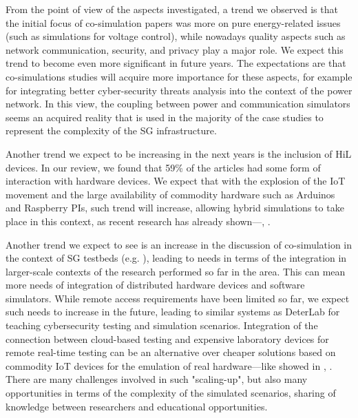 \documentclass[1p]{elsarticle} %
\begin{document}
From the point of view of the aspects investigated, a trend we observed is that the initial focus of co-simulation papers was more on pure energy-related issues (such as simulations for voltage control), while nowadays quality aspects such as network communication, security, and privacy play a major role. We expect this trend to become even more significant in future years. The expectations are that co-simulations studies will acquire more importance for these aspects, for example for integrating better cyber-security threats analysis into the context of the power network. In this view, the coupling between power and communication simulators seems an acquired reality that is used in the majority of the case studies to represent the complexity of the SG infrastructure.

Another trend we expect to be increasing in the next years is the inclusion of HiL devices. In our review, we found that 59\% of the articles had some form of interaction with hardware devices. We expect that with the explosion of the IoT movement and the large availability of commodity hardware such as Arduinos and Raspberry PIs, such trend will increase, allowing hybrid simulations to take place in this context, as recent research has already shown---\cite{094-Schvarcbacher2017-SmartGridsCo,ref:schvar2018SGTMP}, .

Another trend we expect to see is an increase in the discussion of co-simulation in the context of SG testbeds (e.g. \cite{ref:cintuglu2017survey}), leading to needs in terms of the integration in larger-scale contexts of the research performed so far in the area. This can mean more needs of integration of distributed hardware devices and software simulators. While remote access requirements have been limited so far, we expect such needs to increase in the future, leading to similar systems as DeterLab \citep{ref:mirkovic2012teaching} for teaching cybersecurity testing and simulation scenarios. Integration of the connection between cloud-based testing and expensive laboratory devices for remote real-time testing can be an alternative over cheaper solutions based on commodity IoT devices for the emulation of real hardware---like showed in \cite{094-Schvarcbacher2017-SmartGridsCo,ref:aurilio2014low}, . There are many challenges involved in such "scaling-up", but also many opportunities in terms of the complexity of the simulated scenarios, sharing of knowledge between researchers and educational opportunities.
\end{document}
